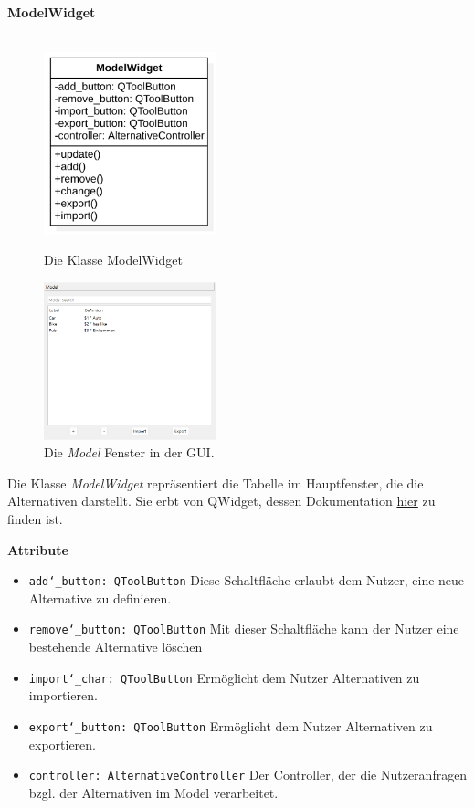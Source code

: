 \documentclass{article}
\begin{document}
\newpage
\textbf{\large{ModelWidget}}\\\\
\begin{figure}[H]%
    \centering
    \begin{minipage}[b]{0.4\textwidth}
        \includegraphics[width=5cm]{entwurf/Entwurf_dokument/img/klassenView/ModelWidget.png}
        \caption{Die Klasse ModelWidget}
    \end{minipage}
    \hfill
    \begin{minipage}[b]{0.4\textwidth}
        \includegraphics[width=5cm]{entwurf/Entwurf_dokument/img/Alissa/ModelGUI.png} 
    \caption{Die \textit{Model} Fenster in der GUI.}
    \end{minipage}
\end{figure}
Die Klasse \textit{ModelWidget} repräsentiert die Tabelle im Hauptfenster, die die Alternativen darstellt. Sie erbt von QWidget, dessen Dokumentation \href{https://doc.qt.io/qt-6/qwidget.html}{hier} zu finden ist. 
\newline \newline

\textbf{{Attribute}}
\begin{itemize}
\item \texttt{add\char`_button: QToolButton} \newline Diese Schaltfläche erlaubt dem Nutzer, eine neue Alternative zu definieren.
\item \texttt{remove\char`_button: QToolButton} \newline Mit dieser Schaltfläche kann der Nutzer eine bestehende Alternative löschen
\item \texttt{import\char`_char: QToolButton} \newline Ermöglicht dem Nutzer Alternativen zu importieren.
\item \texttt{export\char`_button: QToolButton} \newline Ermöglicht dem Nutzer Alternativen zu exportieren.
\item \texttt{controller: AlternativeController} \newline Der Controller, der die Nutzeranfragen bzgl. der Alternativen im Model verarbeitet.
\end{itemize}
\end{document}
